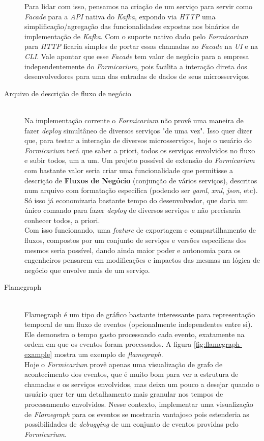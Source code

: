 \begin{description}
  Para lidar com isso, pensamos na criação de um serviço para servir como \textit{Facade} para a \textit{API} nativa do \textit{Kafka}, expondo via \textit{HTTP} uma simplificação/agregação das funcionalidades expostas nos binários de implementação de \textit{Kafka}. Com o suporte nativo dado pelo \textit{Formicarium} para \textit{HTTP} ficaria simples de portar essas chamadas ao \textit{Facade} na \textit{UI} e na \textit{CLI}. Vale apontar que esse \textit{Facade} tem valor de negócio para a empresa independentemente do \textit{Formicarium}, pois facilita a interação direta dos desenvolvedores para uma das entradas de dados de seus microsserviços.
  \item[Arquivo de descrição de fluxo de negócio]
  \hfill \\Na implementação corrente o \textit{Formicarium} não provê uma maneira de fazer \textit{deploy} simultâneo de diversos serviços "de uma vez". Isso quer dizer que, para testar a interação de diversos microsserviços, hoje o usuário do \textit{Formicarium} terá que saber a priori, todos os serviços envolvidos no fluxo e subir todos, um a um. Um projeto possível de extensão do \textit{Formicarium} com bastante valor seria criar uma funcionalidade que permitisse a descrição de \textbf{Fluxos de Negócio} (conjunção de vários serviços), descritos num arquivo com formatação específica (podendo ser \textit{yaml}, \textit{xml}, \textit{json}, etc).
  \\Só isso já economizaria bastante tempo do desenvolvedor, que daria um único comando para fazer \textit{deploy} de diversos serviços e não precisaria conhecer todos, a priori.
  \\Com isso funcionando, uma \textit{feature} de exportagem e compartilhamento de fluxos, compostos por um conjunto de serviços e versões específicas dos mesmos seria possível, dando ainda maior poder e autonomia para os engenheiros pensarem em modificações e impactos das mesmas na lógica de negócio que envolve mais de um serviço. 
  \item[Flamegraph] %
  \hfill \\Flamegraph é um tipo de gráfico bastante interessante para representação temporal de um fluxo de eventos (opcionalmente independentes entre si). Ele demonstra o tempo gasto processando cada evento, exatamente na ordem em que os eventos foram processados. A figura \ref{fig:flamegraph-example} mostra um exemplo de \textit{flamegraph}.\\
	Hoje o \textit{Formicarium} provê apenas uma visualização de grafo de acontecimento dos eventos, que é muito bom para ver a estrutura de chamadas e os serviços envolvidos, mas deixa um pouco a desejar quando o usuário quer ter um detalhamento mais granular nos tempos de processamento envolvidos. Nesse contexto, implementar uma visualização de \textit{Flamegraph} para os eventos se mostraria vantajoso pois estenderia as possibilidades de \textit{debugging} de um conjunto de eventos providas pelo \textit{Formicarium}.

\end{description}
